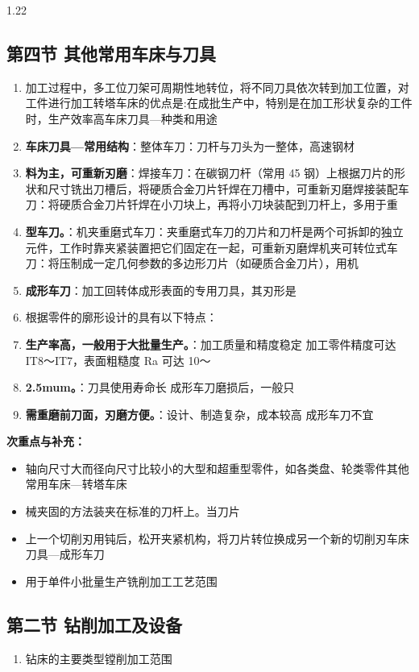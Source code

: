 \documentclass[12pt,a4paper]{article}
\begin{document}
\begin{spacing}{1.22}
\subsection{第四节 其他常用车床与刀具}
\begin{tcolorbox}[colback=yellow!6,colframe=red!55!black,title=重点,left=1mm,right=1mm]
\begin{enumerate}[leftmargin=2.2em,label=\arabic*.]
  \item 加工过程中，多工位刀架可周期性地转位，将不同刀具依次转到加工位置，对工件进行加工转塔车床的优点是:在成批生产中，特别是在加工形状复杂的工件时，生产效率高车床刀具—种类和用途
  \item \textbf{车床刀具—常用结构}：整体车刀：刀杆与刀头为一整体，高速钢材
  \item \textbf{料为主，可重新刃磨}：焊接车刀：在碳钢刀杆（常用 45 钢）上根据刀片的形状和尺寸铣出刀槽后，将硬质合金刀片钎焊在刀槽中，可重新刃磨焊接装配车刀：将硬质合金刀片钎焊在小刀块上，再将小刀块装配到刀杆上，多用于重
  \item \textbf{型车刀。}：机夹重磨式车刀：夹重磨式车刀的刀片和刀杆是两个可拆卸的独立元件，工作时靠夹紧装置把它们固定在一起，可重新刃磨焊机夹可转位式车刀：将压制成一定几何参数的多边形刀片（如硬质合金刀片），用机
  \item \textbf{成形车刀}：加工回转体成形表面的专用刀具，其刃形是
  \item 根据零件的廓形设计的具有以下特点：
  \item \textbf{生产率高，一般用于大批量生产。}：加工质量和精度稳定 加工零件精度可达IT8～IT7，表面粗糙度 Ra 可达 10～
  \item \textbf{2.5mum。}：刀具使用寿命长 成形车刀磨损后，一般只
  \item \textbf{需重磨前刀面，刃磨方便。}：设计、制造复杂，成本较高 成形车刀不宜
\end{enumerate}
\end{tcolorbox}
\noindent\textbf{次重点与补充：}
\begin{itemize}[leftmargin=2.2em,label=--]
  \item 轴向尺寸大而径向尺寸比较小的大型和超重型零件，如各类盘、轮类零件其他常用车床—转塔车床
  \item 械夹固的方法装夹在标准的刀杆上。当刀片
  \item 上一个切削刃用钝后，松开夹紧机构，将刀片转位换成另一个新的切削刃车床刀具—成形车刀
  \item 用于单件小批量生产铣削加工工艺范围
\end{itemize}

\subsection{第二节 钻削加工及设备}
\begin{tcolorbox}[colback=yellow!6,colframe=red!55!black,title=重点,left=1mm,right=1mm]
\begin{enumerate}[leftmargin=2.2em,label=\arabic*.]
  \item 钻床的主要类型镗削加工范围
\end{enumerate}
\end{tcolorbox}


\end{spacing}
\end{document}
